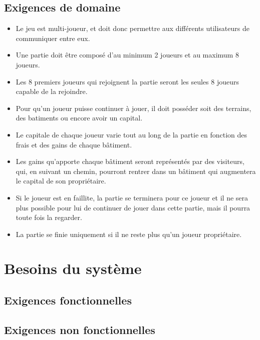 \documentclass[a4paper,11pt]{report}
\begin{document}
\newpage

\section{Exigences de domaine}
\begin{itemize}
 \item Le jeu est multi-joueur, et doit donc permettre aux différents utilisateurs de communiquer entre eux.
 \item Une partie doit être composé d'au minimum 2 joueurs et au maximum 8 joueurs.
 \item Les 8 premiers joueurs qui rejoignent la partie seront les seules 8 joueurs capable de la rejoindre.
 \item Pour qu'un joueur puisse continuer à jouer, il doit posséder soit des terrains, des batiments ou encore avoir
 un capital. 
 \item Le capitale de chaque joueur varie tout au long de la partie en fonction des frais et des gains de chaque bâtiment.
 \item Les gains qu'apporte chaque bâtiment seront représentés par des visiteurs, qui, en suivant un chemin, pourront 
 rentrer dans un bâtiment qui augmentera le capital de son propriétaire.
 \item Si le joueur est en faillite, la partie se terminera pour ce joueur et il ne sera plus possible pour lui de
 continuer de jouer dans cette partie, mais il pourra toute fois la regarder.
 \item La partie se finie uniquement si il ne reste plus qu'un joueur propriétaire.

 \end{itemize}

\newpage
\chapter{Besoins du système}
\section{Exigences fonctionnelles}
\section{Exigences non fonctionnelles}
\end{document}
